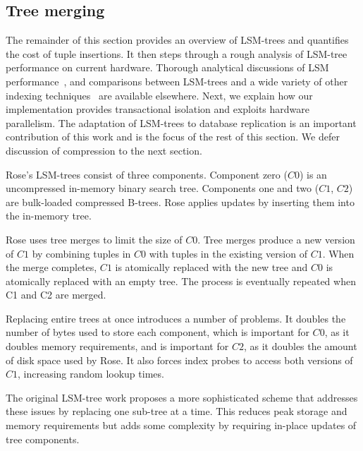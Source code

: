 \documentclass{vldb}
\newcommand{\rows}{Rose\xspace}
\newcommand{\rowss}{Rose's\xspace}
\newcommand{\xxx}[1]{\textcolor{red}{\bf XXX: #1}}
\renewcommand{\xxx}[1]{\xspace}
\begin{document}

\subsection{Tree merging}
\xxx{This information doesn't belong here... place it throughout this section}

The remainder of this section provides an overview of LSM-trees and quantifies the
cost of tuple insertions.  It then steps through a rough analysis of
LSM-tree performance on current hardware.  Thorough analytical discussions of LSM
performance~\cite{lsm}, and comparisons between LSM-trees and a wide variety of other indexing techniques~\cite{partexp} are available elsewhere.  Next,
we explain how our implementation provides transactional isolation and
exploits hardware parallelism.  The adaptation of LSM-trees to
database replication is an important contribution of this work and is
the focus of the rest of this section.  We defer discussion of
compression to the next section.

\rowss LSM-trees consist of three components.  Component zero ($C0$)
is an uncompressed in-memory binary search tree.  Components one and
two ($C1$, $C2$) are bulk-loaded compressed B-trees.  \rows applies
updates by inserting them into the in-memory tree.

\rows uses tree merges to limit the size of $C0$.  Tree merges
produce a new version of $C1$ by combining tuples in $C0$ with tuples
in the existing version of $C1$.  When the merge completes, $C1$ is
atomically replaced with the new tree and $C0$ is atomically replaced
with an empty tree.  The process is eventually repeated when C1 and C2
are merged.

Replacing entire trees at once introduces a number of problems.  It
doubles the number of bytes used to store each component, which is
important for $C0$, as it doubles memory requirements, and is
important for $C2$, as it doubles the amount of disk space used by
\rows.  It also forces index probes to access both versions of $C1$,
increasing random lookup times.

The original LSM-tree work proposes a more sophisticated scheme that
addresses these issues by replacing one sub-tree at a time.  This
reduces peak storage and memory requirements but adds some complexity
by requiring in-place updates of tree components.
\end{document}
